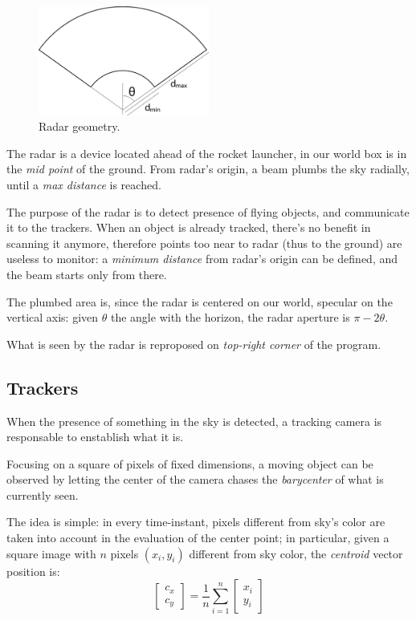 \documentclass[notitlepage,a4paper,11pt]{article} %
\begin{document}
		\begin{figure}[htb]
		\centering \includegraphics[width=0.5\textwidth]{radar}
			\caption{Radar geometry.}
		\end{figure}

		The radar is a device located ahead of the rocket launcher, in our world box is in the \emph{mid point} of the ground. From radar's origin, a beam plumbs the sky radially, until a \emph{max distance} is reached.

		The purpose of the radar is to detect presence of flying objects, and communicate it to the trackers. When an object is already tracked, there's no benefit in scanning it anymore, therefore points too near to radar (thus to the ground) are useless to monitor: a \emph{minimum distance} from radar's origin can be defined, and the beam starts only from there.

		The plumbed area is, since the radar is centered on our world, specular on the vertical axis: given $\theta$ the angle with the horizon, the radar aperture is $\pi - 2\theta$.

		What is seen by the radar is reproposed on \emph{top-right corner} of the program.

	\subsection{Trackers}

		When the presence of something in the sky is detected, a tracking camera is responsable to enstablish what it is.

		Focusing on a square of pixels of fixed dimensions, a moving object can be observed by letting the center of the camera chases the \emph{barycenter} of what is currently seen.

		The idea is simple: in every time-instant, pixels different from sky's color are taken into account in the evaluation of the center point; in particular, given a square image with $n$ pixels $(x_i,y_i)$ different from sky color, the \emph{centroid} vector position is:
		\begin{equation}
			\begin{bmatrix} c_x \\ c_y \end{bmatrix} = \frac{1}{n} \sum_{i=1}^n \begin{bmatrix} x_i \\ y_i \end{bmatrix}
		\end{equation}
\end{document}
